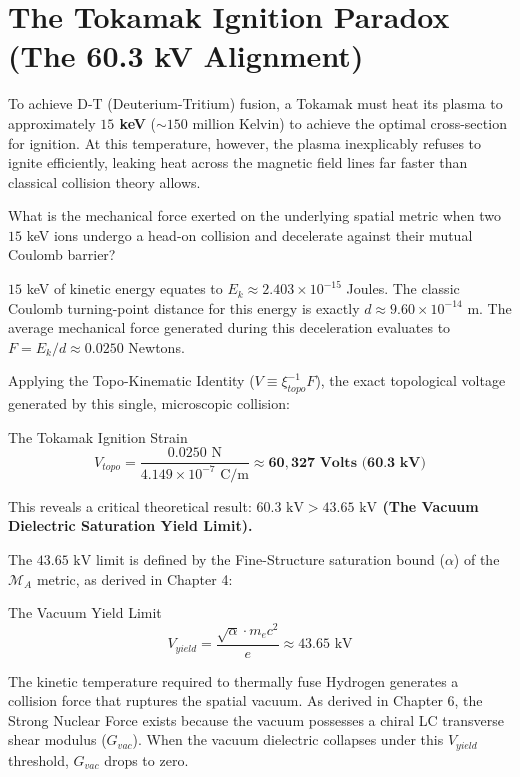 \section{The Tokamak Ignition Paradox (The 60.3 kV Alignment)}
To achieve D-T (Deuterium-Tritium) fusion, a Tokamak must heat its plasma to approximately \textbf{$15$ keV} ($\sim 150$ million Kelvin) to achieve the optimal cross-section for ignition. At this temperature, however, the plasma inexplicably refuses to ignite efficiently, leaking heat across the magnetic field lines far faster than classical collision theory allows.

What is the mechanical force exerted on the underlying spatial metric when two $15$ keV ions undergo a head-on collision and decelerate against their mutual Coulomb barrier? 

$15$ keV of kinetic energy equates to $E_k \approx 2.403 \times 10^{-15}$ Joules. The classic Coulomb turning-point distance for this energy is exactly $d \approx 9.60 \times 10^{-14}$ m. 
The average mechanical force generated during this deceleration evaluates to $F = E_k / d \approx 0.0250$ Newtons. 

Applying the Topo-Kinematic Identity ($V \equiv \xi_{topo}^{-1} F$), the exact topological voltage generated by this single, microscopic collision:
\begin{resultbox}{The Tokamak Ignition Strain}
\begin{equation}
    V_{topo} = \frac{0.0250 \text{ N}}{4.149 \times 10^{-7} \text{ C/m}} \approx \mathbf{60,327 \text{ Volts (60.3 kV)}}
\end{equation}
\end{resultbox}

This reveals a critical theoretical result: \textbf{$60.3 \text{ kV} > 43.65 \text{ kV}$ (The Vacuum Dielectric Saturation Yield Limit).}

The $43.65 \text{ kV}$ limit is defined by the Fine-Structure saturation bound ($\alpha$) of the $\mathcal{M}_A$ metric, as derived in Chapter 4:
\begin{resultbox}{The Vacuum Yield Limit}
\begin{equation}
    V_{yield} = \frac{\sqrt{\alpha} \cdot m_e c^2}{e} \approx 43.65\text{ kV}
\end{equation}
\end{resultbox}

The kinetic temperature required to thermally fuse Hydrogen generates a collision force that ruptures the spatial vacuum. As derived in Chapter 6, the Strong Nuclear Force exists because the vacuum possesses a chiral LC transverse shear modulus ($G_{vac}$). When the vacuum dielectric collapses under this $V_{yield}$ threshold, $G_{vac}$ drops to zero. 

